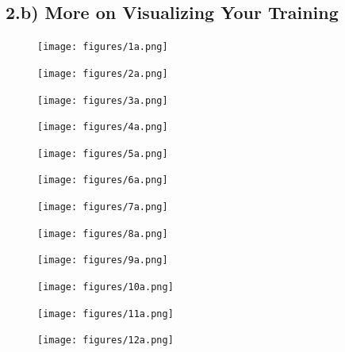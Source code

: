 \documentclass{article}
\begin{document}
\subsection*{2.b) More on Visualizing Your Training}
	\begin{figure}[H]
		\centering
		\texttt{[image: figures/1a.png]}
	\end{figure}

	\begin{figure}[H]
		\centering
		\texttt{[image: figures/2a.png]}
	\end{figure}
	\begin{figure}[H]
		\centering
		\texttt{[image: figures/3a.png]}
	\end{figure}
	\begin{figure}[H]
		\centering
		\texttt{[image: figures/4a.png]}
	\end{figure}
	\begin{figure}[H]
		\centering
		\texttt{[image: figures/5a.png]}
	\end{figure}
	\begin{figure}[H]
		\centering
		\texttt{[image: figures/6a.png]}
	\end{figure}
	\begin{figure}[H]
		\centering
		\texttt{[image: figures/7a.png]}
	\end{figure}
	\begin{figure}[H]
		\centering
		\texttt{[image: figures/8a.png]}
	\end{figure}
	\begin{figure}[H]
		\centering
		\texttt{[image: figures/9a.png]}
	\end{figure}
	\begin{figure}[H]
		\centering
		\texttt{[image: figures/10a.png]}
	\end{figure}
	\begin{figure}[H]
		\centering
		\texttt{[image: figures/11a.png]}
	\end{figure}
	\begin{figure}[H]
		\centering
		\texttt{[image: figures/12a.png]}
	\end{figure}
\end{document}
